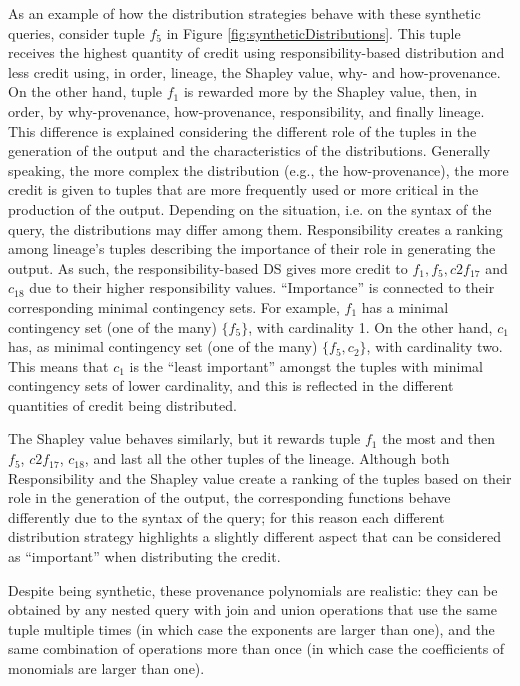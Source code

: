 \documentclass[preprint,12pt,sort&compress]{elsarticle}
\newcommand{\rtwo}[1]{\textcolor{reviewer2}{#1}}
\begin{document}
As an example of how the distribution strategies behave with these synthetic queries, consider tuple $f_5$ in Figure \ref{fig:syntheticDistributions}.
\rtwo{  This tuple receives the highest quantity of credit using responsibility-based distribution and less credit using, in order, lineage, the Shapley value, why- and how-provenance.
On the other hand, tuple $f_1$ is rewarded more by the Shapley value, then, in order, by why-provenance, how-provenance, responsibility, and finally lineage. 
This difference is explained considering the different role of the tuples in the generation of the output and the characteristics of the distributions.
Generally speaking, the more complex the distribution (e.g., the how-provenance), the more credit is given to tuples that are more frequently used or more critical in the production of the output. Depending on the situation, i.e. on the syntax of the query, the distributions may differ among them. 
Responsibility creates a ranking among lineage's tuples describing the importance of their role in generating the output. As such, the responsibility-based DS gives more credit to $f_1, f_5, c2f_{17}$ and $c_{18}$ due to their higher responsibility values. ``Importance'' is connected to their corresponding minimal contingency sets. For example, $f_1$ has a minimal contingency set (one of the many) $\{f_5\}$, with cardinality 1. On the other hand, $c_1$ has, as minimal contingency set (one of the many) $\{f_5, c_2\}$, with cardinality two. This means that $c_1$ is the ``least important'' amongst the tuples with minimal contingency sets of lower cardinality, and this is reflected in the different quantities of credit being distributed.} 

\rtwo{The Shapley value behaves similarly, but it rewards tuple $f_1$ the most and then $f_5$, $c2f_{17}$, $c_{18}$, and last all the other tuples of the lineage. Although both Responsibility and the Shapley value create a ranking of the tuples based on their role in the generation of the output, the corresponding functions behave differently due to the syntax of the query; for this reason each different distribution strategy highlights a slightly different aspect that can be considered as ``important'' when distributing the credit.}

Despite being synthetic, these provenance polynomials are realistic:  they can be obtained by any nested query with join and union operations that use the same tuple multiple times (in which case the exponents are larger than one), and the same combination of operations more than once (in which case the coefficients of monomials are larger than one). 
\end{document}

